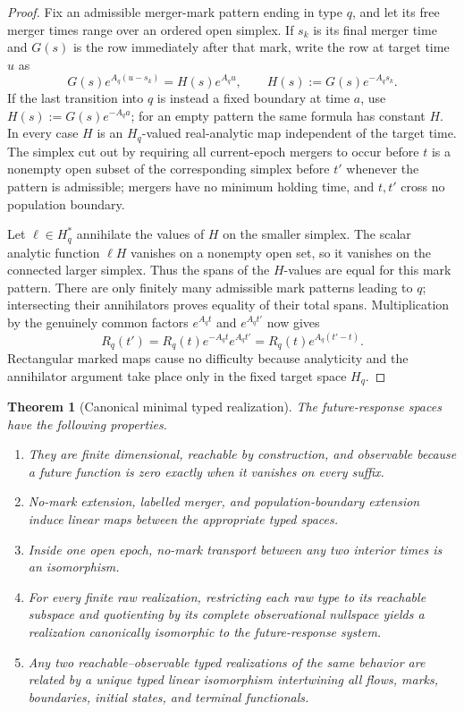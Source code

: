 \documentclass[11pt]{article}
\newtheorem{theorem}{Theorem}[section]
\begin{document}
\begin{proof}
Fix an admissible merger-mark pattern ending in type $q$, and let its free merger times range over an ordered open simplex.  If $s_k$ is its final merger time and $G(s)$ is the row immediately after that mark, write the row at target time $u$ as
\[
G(s)e^{A_q(u-s_k)}=H(s)e^{A_qu},
\qquad H(s):=G(s)e^{-A_qs_k}.
\]
If the last transition into $q$ is instead a fixed boundary at time $a$, use $H(s):=G(s)e^{-A_qa}$; for an empty pattern the same formula has constant $H$.  In every case $H$ is an $H_q$-valued real-analytic map independent of the target time.  The simplex cut out by requiring all current-epoch mergers to occur before $t$ is a nonempty open subset of the corresponding simplex before $t'$ whenever the pattern is admissible; mergers have no minimum holding time, and $t,t'$ cross no population boundary.

Let $\ell\in H_q^*$ annihilate the values of $H$ on the smaller simplex.  The scalar analytic function $\ell H$ vanishes on a nonempty open set, so it vanishes on the connected larger simplex.  Thus the spans of the $H$-values are equal for this mark pattern.  There are only finitely many admissible mark patterns leading to $q$; intersecting their annihilators proves equality of their total spans.  Multiplication by the genuinely common factors $e^{A_qt}$ and $e^{A_qt'}$ now gives
\[
R_q(t')=R_q(t)e^{-A_qt}e^{A_qt'}=R_q(t)e^{A_q(t'-t)}.
\]
Rectangular marked maps cause no difficulty because analyticity and the annihilator argument take place only in the fixed target space $H_q$.
\end{proof}

\begin{theorem}[Canonical minimal typed realization]
\label{thm:minimal}
The future-response spaces have the following properties.
\begin{enumerate}[label=(\roman*)]
\item They are finite dimensional, reachable by construction, and observable because a future function is zero exactly when it vanishes on every suffix.
\item No-mark extension, labelled merger, and population-boundary extension induce linear maps between the appropriate typed spaces.
\item Inside one open epoch, no-mark transport between any two interior times is an isomorphism.
\item For every finite raw realization, restricting each raw type to its reachable subspace and quotienting by its complete observational nullspace yields a realization canonically isomorphic to the future-response system.
\item Any two reachable--observable typed realizations of the same behavior are related by a unique typed linear isomorphism intertwining all flows, marks, boundaries, initial states, and terminal functionals.
\end{enumerate}
\end{theorem}
\end{document}
